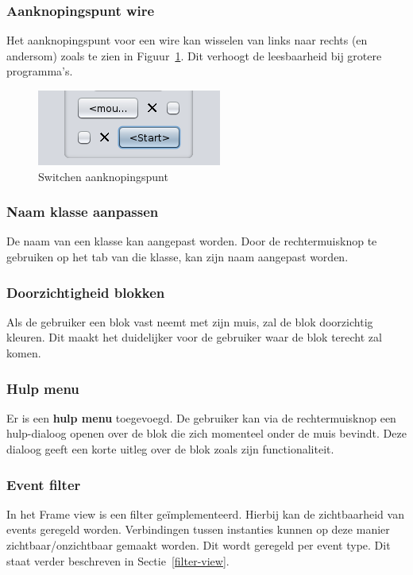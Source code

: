 \documentclass[]{article}
\begin{document}
\subsubsection{Aanknopingspunt wire}
Het aanknopingspunt voor een wire kan wisselen van links naar rechts (en andersom) zoals te zien in Figuur~\ref{switchaanknoping}. Dit verhoogt de leesbaarheid bij grotere programma's.
\begin{figure}[H]
\centering
\includegraphics[scale=1]{./Functionaliteit/buttonswitch.png}
\caption{Switchen aanknopingspunt}
\label{switchaanknoping}
\end{figure}

\subsubsection{Naam klasse aanpassen}
De naam van een klasse kan aangepast worden. Door de rechtermuisknop te gebruiken op het tab van die klasse, kan zijn naam aangepast worden. 

\subsubsection{Doorzichtigheid blokken}
Als de gebruiker een blok vast neemt met zijn muis, zal de blok doorzichtig kleuren. Dit maakt het duidelijker voor de gebruiker waar de blok terecht zal komen.

\subsubsection{Hulp menu}
Er is een \textbf{hulp menu} toegevoegd. De gebruiker kan via de rechtermuisknop een hulp-dialoog openen over de blok die zich momenteel onder de muis bevindt. Deze dialoog geeft een korte uitleg over de blok zoals zijn functionaliteit.

\subsubsection{Event filter} 
In het Frame view is een filter ge\"implementeerd. Hierbij kan de zichtbaarheid van events geregeld worden. Verbindingen tussen instanties kunnen op deze manier zichtbaar/onzichtbaar gemaakt worden. Dit wordt geregeld per event type. Dit staat verder beschreven in Sectie~\ref{filter-view}.
\end{document}
